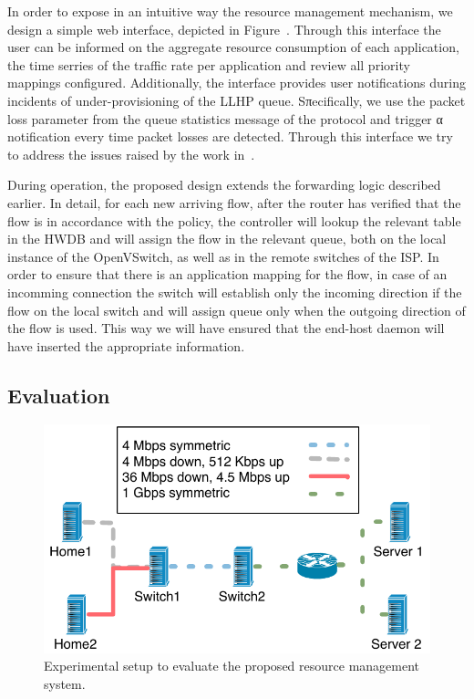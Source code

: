 In order to expose in an intuitive way the resource management mechanism, we
design a simple web interface, depicted in Figure~\cite{fig:homework_intf_qos}.
Through this interface the user can be informed on the aggregate resource
consumption of each application, the time serries of the traffic rate per
application and review all priority mappings configured. Additionally, the
interface provides user notifications during incidents of  under-provisioning of
the LLHP queue. Sπecifically, we use the packet loss parameter from the queue
statistics message of the \of protocol and trigger α notification every time
packet losses are detected.  Through this interface we try to address the issues
raised by the work in~\cite{Chetty10}. 

During operation, the proposed design extends the forwarding logic described
earlier. In detail, for each new arriving flow, after the router has verified
that the flow is in accordance with the policy, the
controller will lookup the relevant table in the HWDB and will assign the flow
in the relevant queue, both on the local instance of the OpenVSwitch, as well as
in the remote switches of the ISP. In order to ensure that there is an
application mapping for the flow, in case of an incomming connection the switch
will establish only the incoming direction if the flow on the local switch and
will assign queue only when the outgoing direction of the flow is used. This way
we will have ensured that the end-host daemon will have inserted the appropriate
information. 

\subsection{Evaluation} \label{sec:qos_eval}

\begin{figure}
  \centering
  \includegraphics[width=0.8\columnwidth]{queue_eval_setup}
  \caption{\label{fig:queue_eval_setup} Experimental setup to evaluate the
    proposed resource management system.}
\end{figure}


